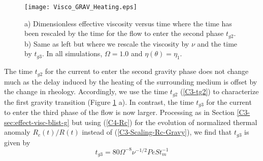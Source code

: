 \begin{figure}[h!]
  \begin{center}
    \graphicspath{ {/Users/thorey/Documents/These/Projet/Refroidissement/Skin_Model/Figure/Figure_Heating/} }
    \texttt{[image: Visco\_GRAV\_Heating.eps]}
    \caption{a)  Dimensionless effective  viscosity versus  time where
      the time has been rescaled by the time for the flow to enter the
      second phase $t_{g2}$. b) Same as  left but where we rescale the
      viscosity  by   $\nu$  and  the   time  by  $t_{g3}$.    In  all
      simulations, $\Omega=1.0$ and $\eta(\theta)=\eta_1$.}
    \label{C4-Visco_GRAV_Heating}
  \end{center}
\end{figure}

The time  $t_{g2}$ for the current  to enter the second  gravity phase
does  not change  much as  the  delay induced  by the  heating of  the
surrounding medium is offset by  the change in rheology.  Accordingly,
we  use the  time $t_{g2}$  (\ref{C3-tg2}) to  characterize the  first
gravity   transition  (Figure   \ref{C4-Visco_GRAV_Heating}  a).    In
contrast, the time  $t_{g3}$ for the current to enter  the third phase
of   the   flow   is   now   larger.    Processing   as   in   Section
\ref{C3-sec:effect-visc-blist-g}  but  using   (\ref{C4-Rc})  for  the
evolution  of  normalized  thermal anomaly  $R_c(t)/R(t)$  instead  of
(\ref{C3-Scaling-Rc-Gravy}), we find that $t_{g3}$ is given by
\begin{equation}
  t_{g3}= 80 \Omega^{-8}\nu^{-1/2}Pe St_m^{-1}
  \label{C4-tg3}
\end{equation}


